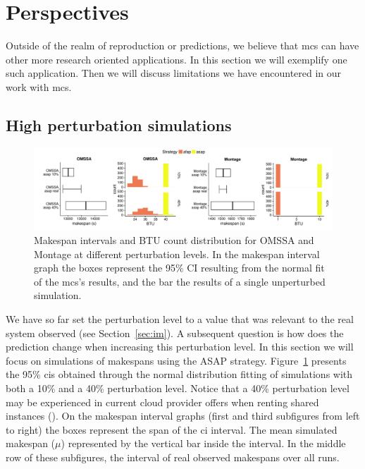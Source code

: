 \documentclass[]{llncs}
\begin{document}
\section{Perspectives}
\label{sec:disc}
Outside of the realm of reproduction or predictions, we believe that \ac{mcs}
can have other more research oriented applications. In this section we will
exemplify one such application. Then we will discuss limitations we have
encountered in our work with \ac{mcs}.

\subsection{High perturbation simulations}\label{sec:sa}
\begin{figure}
	\includegraphics[width=\textwidth]{gfx/int_plot.pdf}
	\caption[caption]{Makespan intervals and BTU count distribution for OMSSA and 
	Montage at different perturbation levels. In the makespan interval graph 
	the boxes represent the 95\% CI resulting from the normal fit of the
	\acs{mcs}'s results, and the bar the results of a single unperturbed 
	simulation.%
	}
	\label{fig:int}
\end{figure}
We have so  far set the perturbation level  to a value that was relevant to the
real system observed  (see Section~\ref{sec:im}).  A subsequent question is how
does the prediction change when increasing this perturbation level. In this
section we will focus on simulations of makespans using the ASAP strategy.
Figure~\ref{fig:int} presents the 95\% \acp{ci} obtained through the normal
distribution fitting of simulations with both a 10\%
and a 40\% perturbation  level. Notice that a 40\% perturbation level may be experienced in
current cloud provider offers when renting shared instances
(\cite{LeitnerC16}). On the makespan interval graphs  (first and third
subfigures  from left  to right)  the boxes  represent the  span of the \ac{ci}
interval. The mean simulated makespan ($\mu{}$) represented by the vertical bar
inside the interval. In the middle row of these subfigures, the interval of 
real observed  makespans over all runs.
\end{document}
